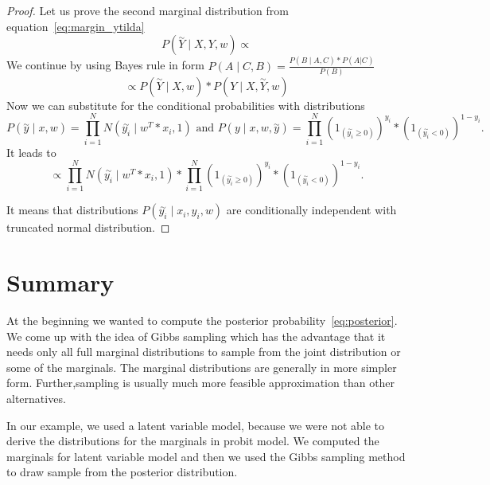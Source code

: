 \begin{proof}
Let us prove the second marginal distribution from equation~\ref{eq:margin_ytilda} 
\begin{equation}
P(\overset{\sim}{Y} \mid X, Y, w) \propto
\end{equation}
We continue by using Bayes rule in form $ P(A \mid C, B) = \frac{P( B \mid A, C) * P(A|C)}{P(B)}$ 
\begin{equation}
    \propto P(\overset{\sim}{Y} \mid X, w) * P(Y \mid X,\overset{\sim}{Y}, w)
\end{equation}
Now we can substitute for the conditional probabilities with distributions
\begin{equation}
    P(\overset{\sim}{y} \mid x,w) = \prod_{i=1}^{N}N(\overset{\sim}{y_i} \mid w^T*x_i, 1) \text{ and } 
    P(y \mid x,w,\overset{\sim}{y}) = \prod_{i=1}^{N}{(1_{(\overset{\sim}{y_i} \ge 0)})}^{y_i} * {(1_{(\overset{\sim}{y_i} < 0)})}^{1-y_i}.
\end{equation}
It leads to
\begin{equation}
    \propto \prod_{i=1}^{N}N(\overset{\sim}{y_i} \mid w^T*x_i, 1) * 
    \prod_{i=1}^{N}{(1_{(\overset{\sim}{y_i} \ge 0)})}^{y_i} * {(1_{(\overset{\sim}{y_i} < 0)})}^{1-y_i}.
\end{equation}

It means that distributions $ P(\overset{\sim}{y_i} \mid  x_i, y_i, w) $ are conditionally independent with truncated normal distribution.
\end{proof}


\section{Summary} 
\label{sec:summary}
At the beginning we wanted to compute the posterior probability~\ref{eq:posterior}. We come up with the idea of Gibbs sampling which has the advantage that it needs only all full marginal distributions to sample from the joint distribution or some of the marginals. The marginal distributions are generally in more simpler form. Further,sampling is usually much more feasible approximation than other alternatives. 

In our example, we used a latent variable model, because we were not able to derive the distributions for the marginals in probit model. We computed the marginals for latent variable model and then we used the Gibbs sampling method to draw sample from the posterior distribution.

